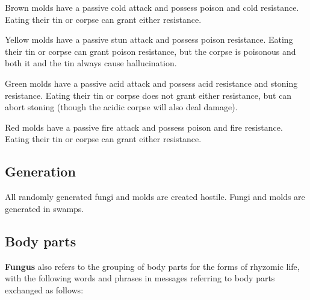 \begin{myitemize}
\item{}Brown molds have a passive cold attack and possess poison and cold resistance. Eating their tin or corpse can grant either resistance.
\item{}Yellow molds have a passive stun attack and possess poison resistance. Eating their tin or corpse can grant poison resistance, but the corpse is poisonous and both it and the tin always cause hallucination.
\item{}Green molds have a passive acid attack and possess acid resistance and stoning resistance. Eating their tin or corpse does not grant either resistance, but can abort stoning (though the acidic corpse will also deal damage).
\item{}Red molds have a passive fire attack and possess poison and fire resistance. Eating their tin or corpse can grant either resistance.
\end{myitemize}

\subsection{Generation}
All randomly generated fungi and molds are created hostile.
Fungi and molds are generated in swamps.

\subsection{Body parts}
\textbf{Fungus} also refers to the grouping of body parts for the forms of rhyzomic life, with the following words and phrases in messages referring to body parts exchanged as follows:


